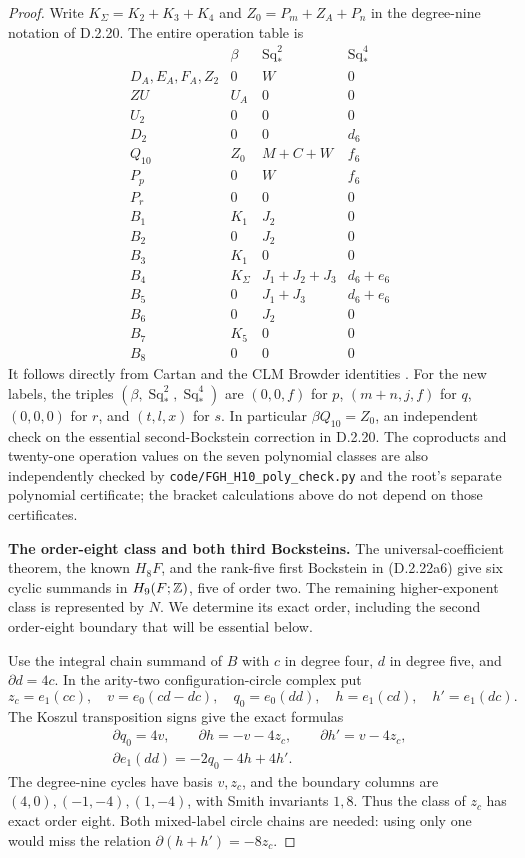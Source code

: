 \begin{proof}
Write $K_\Sigma=K_2+K_3+K_4$ and
$Z_0=P_m+Z_A+P_n$ in the degree-nine notation of
\textup{D.2.20}. The entire operation table is
\[
\begin{array}{c|ccc}
 &\beta&\operatorname{Sq}_*^2&\operatorname{Sq}_*^4\\\hline
 D_A,E_A,F_A,Z_2&0&W&0\\
 ZU&U_A&0&0\\
 U_2&0&0&0\\
 D_2&0&0&d_6\\
 Q_{10}&Z_0&M+C+W&f_6\\
 P_p&0&W&f_6\\
 P_r&0&0&0\\
 B_1&K_1&J_2&0\\
 B_2&0&J_2&0\\
 B_3&K_1&0&0\\
 B_4&K_\Sigma&J_1+J_2+J_3&d_6+e_6\\
 B_5&0&J_1+J_3&d_6+e_6\\
 B_6&0&J_2&0\\
 B_7&K_5&0&0\\
 B_8&0&0&0
\end{array}
\tag{D.2.22a6}
\]
It follows directly from Cartan and the CLM Browder identities
\cite[Chapter III, Theorems 1.2--1.4]{I_CohenLadaMay1976}.
For the new labels, the triples $(\beta,\operatorname{Sq}_*^2,
\operatorname{Sq}_*^4)$ are $(0,0,f)$ for $p$,
$(m+n,j,f)$ for $q$, $(0,0,0)$ for $r$, and $(t,l,x)$ for $s$.
In particular $\beta Q_{10}=Z_0$, an independent check on the
essential second-Bockstein correction in \textup{D.2.20}.
The coproducts and twenty-one operation values on the seven
polynomial classes are also independently checked by
\texttt{code/FGH\_H10\_poly\_check.py} and the root's separate
polynomial certificate; the bracket calculations above do not
depend on those certificates.

\medskip\noindent
\textbf{The order-eight class and both third Bocksteins.}
The universal-coefficient theorem, the known $H_8F$, and the
rank-five first Bockstein in \textup{(D.2.22a6)} give six cyclic
summands in $H_9(F;\mathbb Z)$, five of order two. The remaining
higher-exponent class is represented by $N$.
We determine its exact order, including the second order-eight
boundary that will be essential below.

Use the integral chain summand of $B$ with $c$ in degree four,
$d$ in degree five, and $\partial d=4c$. In the arity-two
configuration-circle complex put
\[
 z_c=e_1(cc),\quad v=e_0(cd-dc),\quad
 q_0=e_0(dd),\quad h=e_1(cd),\quad h'=e_1(dc).
\]
The Koszul transposition signs give the exact formulas
\[
\begin{gathered}
 \partial q_0=4v,\qquad
 \partial h=-v-4z_c,\qquad
 \partial h'=v-4z_c,\\
 \partial e_1(dd)=-2q_0-4h+4h'.
\end{gathered}
\tag{D.2.22a7}
\]
The degree-nine cycles have basis $v,z_c$, and the boundary
columns are $(4,0),(-1,-4),(1,-4)$, with Smith invariants
$1,8$. Thus the class of $z_c$ has exact order eight.
Both mixed-label circle chains are needed: using only one
would miss the relation $\partial(h+h')=-8z_c$.


\end{proof}
